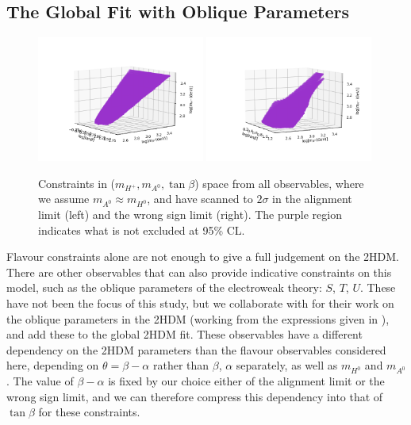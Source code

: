 \documentclass[a4paper,12pt]{article}
\begin{document}
\subsection{The Global Fit with Oblique Parameters}
\label{subsec:oblique}
\begin{figure}[ht]
    \centering
    \includegraphics[width=0.49\textwidth,trim=6em 3em 10pt 6em,clip]{../global/threedimfit.png}
    \includegraphics[width=0.49\textwidth,trim=6em 3em 10pt 6em,clip]{../global/threedimfit1.png}
    \caption{\label{fig:threed}Constraints in ($m_{H^+},m_{A^0},\tan\beta$) space from all observables, where we assume $m_{A^0}\approx m_{H^0}$, and have scanned to $2\sigma$ in the alignment limit (left) and the wrong sign limit (right).
    The purple region indicates what is not excluded at 95\% CL.}
\end{figure}
Flavour constraints alone are not enough to give a full judgement on the 2HDM. 
There are other observables that can also provide indicative constraints on this model, such as the oblique parameters of the electroweak theory: $S$, $T$, $U$. 
These have not been the focus of this study, but we collaborate with \cite{james} for their work on the oblique parameters in the 2HDM (working from the expressions given in \cite{oblique,hunter}), and add these to the global 2HDM fit. 
These observables have a different dependency on the 2HDM parameters than the flavour observables considered here, depending on $\theta=\beta-\alpha$ rather than $\beta$, $\alpha$ separately, as well as $m_{H^0}$ and $m_{A^0}$. 
The value of $\beta-\alpha$ is fixed by our choice either of the alignment limit or the wrong sign limit, and we can therefore compress this dependency into that of $\tan\beta$ for these constraints. 
\end{document}
